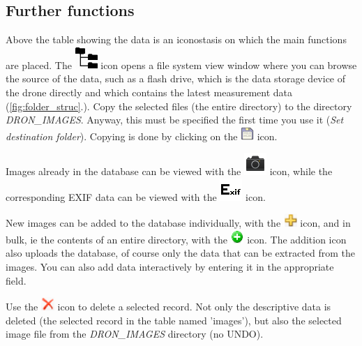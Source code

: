 \documentclass[a4paper,12pt]{article}
\begin{document}
\subsection{Further functions}

Above the table showing the data is an iconostasis on which the main functions are placed. The \includegraphics [width = 0.5 cm] {filesystem.png} icon opens a file system view window where you can browse the source of the data, such as a flash drive, which is the data storage device of the drone directly and which contains the latest measurement data (\ref{fig:folder_struc}.). Copy the selected files (the entire directory) to the directory \textit{DRON\_IMAGES}. Anyway, this must be specified the first time you use it (\textit {Set destination folder}). Copying is done by clicking on the \includegraphics [width = 0.5cm] {save.png} icon.

Images already in the database can be viewed with the \includegraphics [width = 0.5 cm] {camera.png} icon, while the corresponding EXIF data can be viewed with the \includegraphics [width = 0.5 cm] {exif.png} icon.

New images can be added to the database individually, with the \includegraphics [width = 0.5cm] {plus.png} icon, and in bulk, ie the contents of an entire directory, with the \includegraphics [width = 0.5cm] {addfolder.png} icon. The addition icon also uploads the database, of course only the data that can be extracted from the images. You can also add data interactively by entering it in the appropriate field. 

Use the \includegraphics [width = 0.5cm] {del.png} icon to delete a selected record. Not only the descriptive data is deleted (the selected record in the table named 'images'), but also the selected image file from the \textit {DRON\_IMAGES} directory (no UNDO). 
\end{document}
